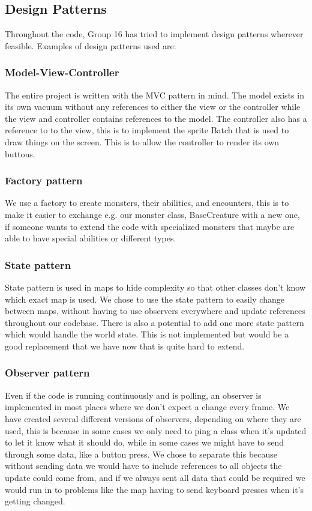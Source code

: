 \subsection{Design Patterns}
Throughout the code, Group 16 has tried to implement design patterns wherever feasible. Examples of design patterns used are:
\subsubsection{Model-View-Controller}
The entire project is written with the MVC pattern in mind. The model exists in its own vacuum without any references to either the view or the controller while the view and controller contains references to the model. The controller also has a reference to to the view, this is to implement the sprite Batch that is used to draw things on the screen. This is to allow the controller to render its own buttons.
\subsubsection{Factory pattern}
We use a factory to create monsters, their abilities, and encounters, this is to make it easier to exchange e.g. our monster class, BaseCreature with a new one, if someone wants to extend the code with specialized monsters that maybe are able to have special abilities or different types.
\subsubsection{State pattern}
State pattern is used in maps to hide complexity so that other classes don't know which exact map is used. We chose to use the state pattern to easily change between maps, without having to use observers everywhere and update references throughout our codebase. There is also a potential to add one more state pattern which would handle the world state. This is not implemented but would be a good replacement that we have now that is quite hard to extend.
\subsubsection{Observer pattern}
Even if the code is running continuously and is polling, an observer is implemented in most places where we don't expect a change every frame. We have created several different versions of observers, depending on where they are used, this is because in some cases we only need to ping a class when it's updated to let it know what it should do, while in some cases we might have to send through some data, like a button press. We chose to separate this because without sending data we would have to include references to all objects the update could come from, and if we always sent all data that could be required we would run in to problems like the map having to send keyboard presses when it's getting changed.
